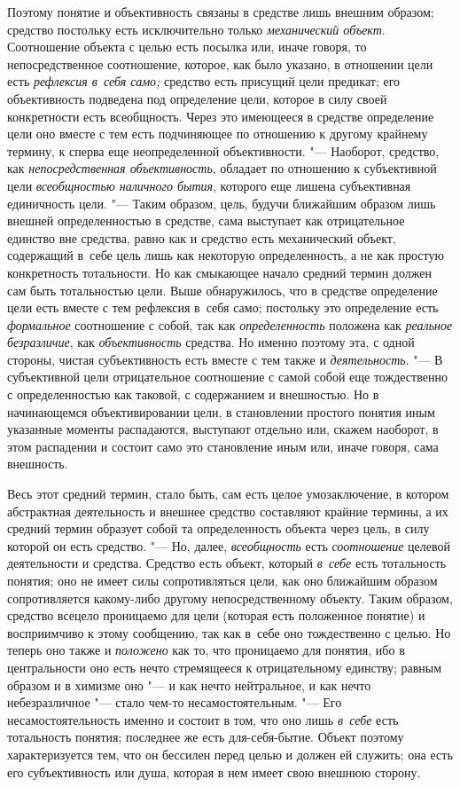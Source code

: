 Поэтому понятие и объективность связаны в средстве лишь
внешним образом; средство постольку есть исключительно только
{\em механический объект}.
Соотношение объекта с целью есть посылка или, иначе говоря,
то непосредственное соотношение, которое, как было указано, в отношении
цели есть {\em рефлексия в~себя само;}
средство есть присущий цели предикат; его объективность
подведена под определение цели, которое в силу своей конкретности есть
всеобщность. Через это имеющееся в средстве определение цели оно вместе с
тем есть подчиняющее по отношению к другому крайнему термину, к сперва еще
неопределенной объективности. "--- Наоборот, средство, как
{\em непосредственная объективность},
обладает по отношению к субъективной цели
{\em всеобщностью наличного бытия},
которого еще лишена субъективная единичность цели. "---
Таким образом, цель, будучи ближайшим образом лишь внешней
определенностью в средстве, сама выступает как отрицательное единство вне
средства, равно как и средство есть механический объект, содержащий в~себе
цель лишь как некоторую определенность, а не как простую конкретность
тотальности. Но как смыкающее начало средний термин должен сам быть
тотальностью цели. Выше обнаружилось, что в средстве определение цели есть
вместе с тем рефлексия в~себя само; постольку это определение есть
{\em формальное}
соотношение с собой, так как
{\em определенность}
положена как {\em реальное
безразличие}, как
{\em объективность}
средства. Но именно поэтому эта, с одной стороны, чистая
субъективность есть вместе с тем также и
{\em деятельность}. "--- В
субъективной цели отрицательное соотношение с самой собой еще тождественно
с определенностью как таковой, с содержанием и внешностью. Но в
начинающемся объективировании цели, в становлении простого понятия иным
указанные моменты распадаются, выступают отдельно или, скажем наоборот, в
этом распадении и состоит само это становление иным или, иначе говоря, сама
внешность.

Весь этот средний термин, стало быть, сам есть целое
умозаключение, в котором абстрактная деятельность и внешнее средство
составляют крайние термины, а их средний термин образует собой та
определенность объекта через цель, в силу которой он есть средство. "---
Но, далее,
{\em всеобщность} есть
{\em соотношение} целевой
деятельности и средства. Средство есть объект, который
{\em в~себе} есть
тотальность понятия; оно не имеет силы сопротивляться цели, как оно
ближайшим образом сопротивляется какому-либо другому непосредственному
объекту. Таким образом, средство всецело проницаемо для цели (которая есть
положенное понятие) и восприимчиво к этому сообщению, так как в~себе оно
тождественно с целью. Но теперь оно также и
{\em положено} как то,
что проницаемо для понятия, ибо в центральности оно есть нечто стремящееся
к отрицательному единству; равным образом и в химизме оно
"--- и как нечто нейтральное, и как нечто небезразличное
"--- стало чем-то несамостоятельным. "--- Его
несамостоятельность именно и состоит в том, что оно лишь
{\em в~себе} есть
тотальность понятия; последнее же есть для-себя-бытие. Объект поэтому
характеризуется тем, что он бессилен перед целью и должен ей служить; она
есть его субъективность или душа, которая в нем имеет свою внешнюю сторону.


